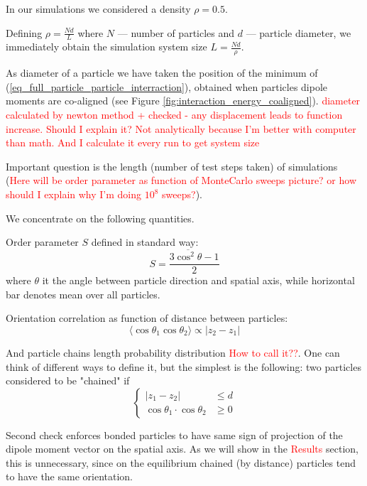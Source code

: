 \documentclass[12pt,a4paper]{article}
\begin{document}
In our simulations we considered a density $\rho = 0.5$.  

Defining $\rho = \frac{N d}{L}$ where $N$ --- number of particles and $d$ --- particle diameter, we immediately obtain the simulation system size $L = \frac{Nd}{\rho}$.

As diameter of a particle we have taken the position of the minimum of (\ref{eq_full_particle_particle_interraction}), obtained when particles dipole moments are co-aligned (see Figure \ref{fig:interaction_energy_coaligned}). \textcolor{red}{diameter calculated by newton method + checked - any displacement leads to function increase. Should I explain it? Not analytically because I'm better with computer than math. And I calculate it every run to get system size}

Important question is the length (number of test steps taken) of simulations (\textcolor{red}{Here will be order parameter as function of MonteCarlo sweeps picture? or how should I explain why I'm doing $10^8$ sweeps?}).

We concentrate on the following quantities.

Order parameter $S$ defined in standard way:
\begin{equation}
S = \frac{3 \overline{\cos^2 \theta} - 1}{2}
\end{equation}
where $\theta$ it the angle between particle direction and spatial axis, while horizontal bar denotes mean over all particles.

Orientation correlation as function of distance between particles:
\begin{equation}
\langle\cos \theta_1 \cos \theta_2\rangle \propto |z_2 - z_1|
\end{equation}

And particle chains length probability distribution \textcolor{red}{How to call it??}. One can think of different ways to define it, but the simplest is the following: two particles considered to be "chained" if 
\begin{equation}
\begin{cases}
	|z_1 - z_2| &\leq d\\
	\cos \theta_1 \cdot \cos \theta_2 &\geq 0
\end{cases}
\end{equation}

Second check enforces bonded particles to have same sign of projection of the dipole moment vector on the spatial axis. As we will show in the \textcolor{red}{Results} section, this is unnecessary, since on the equilibrium chained (by distance) particles tend to have the same orientation.

\cite{Camp2000}



\end{document}
